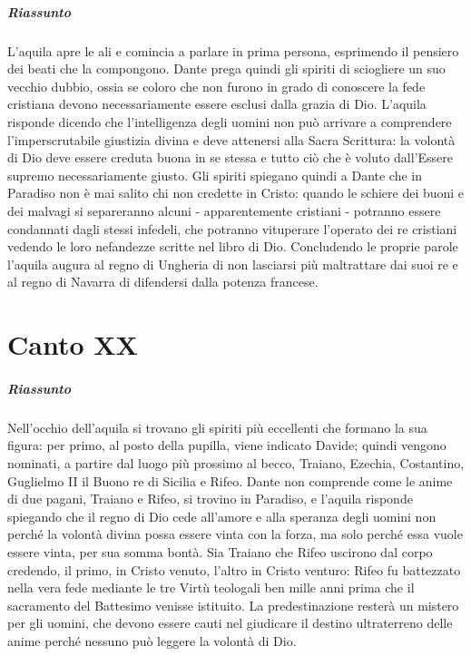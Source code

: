 \documentclass[a4paper, twoside, titlepage]{book}
\begin{document}
\paragraph{Riassunto} L’aquila apre le ali e comincia a parlare in prima persona, esprimendo il pensiero dei beati che la compongono. Dante prega quindi gli spiriti di sciogliere un suo vecchio dubbio, ossia se coloro che non furono in grado di conoscere la fede cristiana devono necessariamente essere esclusi dalla grazia di Dio. L’aquila risponde dicendo che l’intelligenza degli uomini non può arrivare a comprendere l’imperscrutabile giustizia divina e deve attenersi alla Sacra Scrittura: la volontà di Dio deve essere creduta buona in se stessa e tutto ciò che è voluto dall’Essere supremo necessariamente giusto. Gli spiriti spiegano quindi a Dante che in Paradiso non è mai salito chi non credette in Cristo: quando le schiere dei buoni e dei malvagi si separeranno alcuni - apparentemente cristiani - potranno essere condannati dagli stessi infedeli, che potranno vituperare l’operato dei re cristiani vedendo le loro nefandezze scritte nel libro di Dio. Concludendo le proprie parole l’aquila augura al regno di Ungheria di non lasciarsi più maltrattare dai suoi re e al regno di Navarra di difendersi dalla potenza francese.

\chapter{Canto XX}

\paragraph{Riassunto} Nell’occhio dell’aquila si trovano gli spiriti più eccellenti che formano la sua figura: per primo, al posto della pupilla, viene indicato Davide; quindi vengono nominati, a partire dal luogo più prossimo al becco, Traiano, Ezechia, Costantino, Guglielmo II il Buono re di Sicilia e Rifeo. Dante non comprende come le anime di due pagani, Traiano e Rifeo, si trovino in Paradiso, e l’aquila risponde spiegando che il regno di Dio cede all’amore e alla speranza degli uomini non perché la volontà divina possa essere vinta con la forza, ma solo perché essa vuole essere vinta, per sua somma bontà. Sia Traiano che Rifeo uscirono dal corpo credendo, il primo, in Cristo venuto, l’altro in Cristo venturo: Rifeo fu battezzato nella vera fede mediante le tre Virtù teologali ben mille anni prima che il sacramento del Battesimo venisse istituito. La predestinazione resterà un mistero per gli uomini, che devono essere cauti nel giudicare il destino ultraterreno delle anime perché nessuno può leggere la volontà di Dio.
\end{document}
